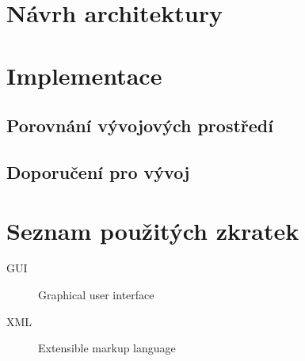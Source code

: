 \documentclass[thesis=M,czech]{FITthesis}[2012/06/26]
\begin{document}
\chapter{Návrh architektury}

\chapter{Implementace}

\section{Porovnání vývojových prostředí}

\section{Doporučení pro vývoj}

\begin{conclusion}
\end{conclusion}




\appendix

\chapter{Seznam použitých zkratek}
\begin{description}
	\item[GUI] Graphical user interface
	\item[XML] Extensible markup language
\end{description}
\end{document}
